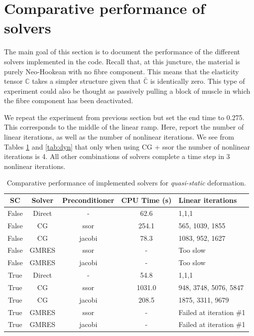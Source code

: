 \documentclass[letterpaper,11pt,oneside,titlepage]{report}
\begin{document}
{\clearpage

\section{Comparative performance of solvers}

The main goal of this section is to document the performance of the different solvers implemented in the code. Recall that, at this juncture, the material is purely Neo-Hookean with no fibre component. This means that the elasticity tensor $\mathbb{C}$ takes a simpler structure given that $\bar{\mathbb{C}}$ is identically zero. This type of experiment could also be thought as passively pulling a block of muscle in which the fibre component has been deactivated.

We repeat the experiment from previous section but set the end time to 0.275. This corresponds to the middle of the linear ramp. Here, report the number of linear iterations, as well as the number of nonlinear iterations. We see from Tables \ref{tab:qs} and \ref{tab:dyn} that only when using CG + ssor the number of nonlinear iterations is 4. All other combinations of solvers complete a time step in 3 nonlinear iterations.

\begin{table}
  \centering
  \begin{tabular}{|c|c|c|c|l|} \hline
    SC & Solver & Preconditioner & CPU Time (s) & Linear iterations \\\hline
    False & Direct & - & 62.6 &  1,1,1  \\\hline
    False & CG & ssor & 254.1 & 565, 1039, 1855 \\\hline
    False & CG & jacobi & 78.3 & 1083, 952, 1627 \\\hline
    False & GMRES & ssor & - & Too slow \\\hline
    False & GMRES & jacobi & - & Too slow \\\hline
    True  & Direct & - & 54.8 & 1,1,1 \\\hline
    True  & CG & ssor & 1031.0 & 948, 3748, 5076, 5847 \\\hline
    True  & CG & jacobi & 208.5 & 1875, 3311, 9679 \\\hline
    True  & GMRES & ssor & - & Failed at iteration \#1 \\\hline
    True  & GMRES & jacobi & - & Failed at iteration \#1 \\\hline
  \end{tabular}
  \caption{Comparative performance of implemented solvers for \textit{quasi-static} deformation. \label{tab:qs}}
\end{table}

}
\end{document}
